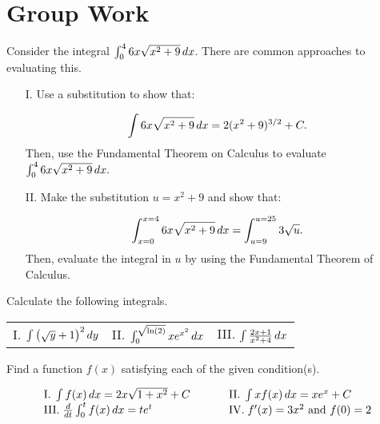 \documentclass[handout,hints]{ximera}
\begin{document}
\section{Group Work}

\begin{problem}
Consider the integral $\int_0^4  6x\sqrt{x^2+9} \mathop{}\!d x$.  There are common approaches to evaluating this.

\begin{itemize}
\item[I.] Use a substitution to show that:

\[\int  6x\sqrt{x^2+9} \mathop{}\!d x = 2(x^2+9)^{3/2} +C.\]  
Then, use the Fundamental Theorem on Calculus to evaluate $\int_0^4  6x\sqrt{x^2+9} \mathop{}\!d x.$ 

\item[II.] Make the substitution $u=x^2+9$ and show that:

\[\int_{x=0}^{x=4}  6x\sqrt{x^2+9} \mathop{}\!d x = \int_{u=9}^{u=25} 3\sqrt{u}.\]  Then, evaluate the integral in $u$ by using the Fundamental Theorem of Calculus.
\end{itemize}


\end{problem}

\begin{problem}
Calculate the following integrals.

\begin{tabular}{lll}
I.  $\int \left(\sqrt{y}+1\right)^2 \mathop{}\!d y$ \hspace{.5in} & II. $\int_0^{\sqrt{\ln(2)}} x e^{x^2} \mathop{}\!d x$ \hspace{.5in} & III. $\int \frac{2x+1}{x^2+4} \mathop{}\!d x$ \hspace{.05in}
\end{tabular}

\end{problem}



\begin{problem}
Find a function $f(x)$ satisfying each of the given condition(s).

$$
\begin{array}{lll}
\mathrm{I.} \; \int f(x) \mathop{}\!d x = 2x \sqrt{1+ x^2} + C & \hspace{.2in} & \mathrm{II.} \; \int xf(x) \mathop{}\!d x = x e^x + C \\
\mathrm{III.} \; \frac{\mathop{}\!d}{\mathop{}\!d t} \int_0^t f(x) \mathop{}\!d x = t e^t & \hspace{.2in} & \mathrm{IV.} \; f'(x) = 3x^2 \mbox{ and } f(0)=2
\end{array}
$$
\end{problem}
\end{document}
